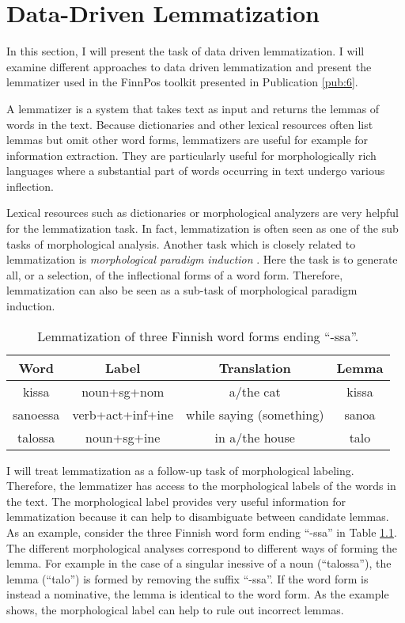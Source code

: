 \chapter{Data-Driven Lemmatization}
\label{chapter:lemmatization}

In this section, I will present the task of data driven
lemmatization. I will examine different approaches to data driven
lemmatization and present the lemmatizer used in the FinnPos toolkit
presented in Publication \ref{pub:6}.

A lemmatizer is a system that takes text as input and returns the
lemmas of words in the text. Because dictionaries and other lexical
resources often list lemmas but omit other word forms, lemmatizers are
useful for example for information extraction. They are particularly
useful for morphologically rich languages where a substantial part of
words occurring in text undergo various inflection.

Lexical resources such as dictionaries or morphological analyzers are
very helpful for the lemmatization task. In fact, lemmatization is
often seen as one of the sub tasks of morphological analysis. Another
task which is closely related to lemmatization is {\it morphological
  paradigm induction} \citep{Ahlberg2014}. Here the task is to
generate all, or a selection, of the inflectional forms of a word
form. Therefore, lemmatization can also be seen as a sub-task of
morphological paradigm induction.

\begin{table}[!htb]
\begin{center}
\begin{tabular}{cccc}
Word & Label & Translation & Lemma  \\
\hline
kissa & noun+sg+nom & a/the cat & kissa \\
sanoessa & verb+act+inf+ine & while saying (something) & sanoa \\
talossa & noun+sg+ine & in a/the house & talo
\end{tabular}
\caption{Lemmatization of three Finnish word forms ending ``-ssa''.}\label{tab:3wf}
\end{center}
\end{table}

I will treat lemmatization as a follow-up task of morphological
labeling. Therefore, the lemmatizer has access to the morphological
labels of the words in the text. The morphological label provides very
useful information for lemmatization because it can help to
disambiguate between candidate lemmas. As an example, consider the
three Finnish word form ending ``-ssa'' in Table \ref{tab:3wf}. The
different morphological analyses correspond to different ways of
forming the lemma. For example in the case of a singular inessive of a
noun (``talossa''), the lemma (``talo'') is formed by removing the
suffix ``-ssa''. If the word form is instead a nominative, the lemma
is identical to the word form. As the example shows, the morphological
label can help to rule out incorrect lemmas.

